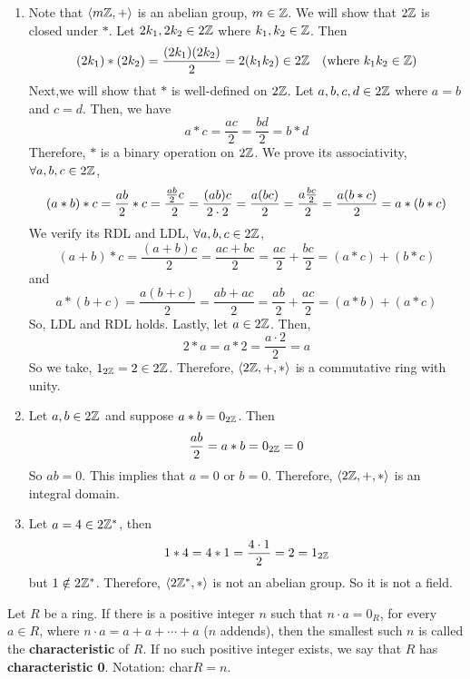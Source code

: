 \begin{solution} \phantom{blank}
    \begin{enumerate}
        \item Note that $\langle m\mathbb{Z}, + \rangle$ is an abelian group, $m \in \mathbb{Z}$. We will show that $2\mathbb{Z}$ is closed under $\ast$. Let $2k_1, 2k_2 \in 2\mathbb{Z}$ where $k_1, k_2 \in \mathbb{Z}$. Then
        \[ (2k_1) \ast (2k_2) = \frac{(2k_1)(2k_2)}{2} = 2(k_1k_2) \in 2\mathbb{Z} \hspace{1em} (\text{where } k_1k_2 \in \mathbb{Z}) \]
        Next,we will show that $\ast$ is well-defined on $2\mathbb{Z}$. Let $a, b, c, d \in 2\mathbb{Z}$ where $a = b$ and $c = d$. Then, we have
        \[ a \ast c = \frac{ac}{2} = \frac{bd}{2} = b \ast d \]
        Therefore, $\ast$ is a binary operation on $2\mathbb{Z}$. We prove its associativity, $\forall a, b, c \in 2\mathbb{Z}$, 
        \[ (a \ast b) \ast c = \frac{ab}{2} \ast c = \frac{\frac{ab}{2} c}{2} = \frac{(ab)c}{2 \cdot 2} = \frac{a (bc)}{2} = \frac{a \frac{bc}{2}}{2} = \frac{a (b \ast c)}{2} = a \ast \qty(b \ast c)  \]
        We verify its RDL and LDL,  $\forall a, b, c \in 2\mathbb{Z}$, 
        \[ (a + b) \ast c = \frac{(a + b)c}{2} = \frac{ac + bc}{2} = \frac{ac}{2} + \frac{bc}{2} = (a \ast c) + (b \ast c) \]
        and 
        \[ a \ast (b + c) = \frac{a(b + c)}{2} = \frac{ab + ac}{2} = \frac{ab}{2} + \frac{ac}{2} = (a \ast b) + (a \ast c) \]
        So, LDL and RDL holds. Lastly, let $a \in 2\mathbb{Z}$. Then,
        \[2 \ast a = a \ast 2 = \frac{a \cdot 2}{2} = a \]
        So we take, $1_{2\mathbb{Z}} = 2 \in 2\mathbb{Z}$. Therefore, $\langle 2\mathbb{Z}, +, \ast \rangle$ is a commutative ring with unity.
        
        \item Let $a, b \in 2\mathbb{Z}$ and suppose $a \ast b = 0_{2\mathbb{Z}}$. Then 
        \[ \frac{ab}{2} = a \ast b = 0_{2\mathbb{Z}} = 0 \]
        So $ab = 0$. This implies that $a = 0$ or $b = 0$. Therefore, $\langle 2\mathbb{Z}, +, \ast \rangle$ is an integral domain.
        
        \item Let $a = 4 \in 2\mathbb{Z}^{\ast}$, then 
        \[ 1 \ast 4 = 4 \ast 1 = \frac{4 \cdot 1}{2} = 2 = 1_{2\mathbb{Z}} \]
        but $1 \notin 2\mathbb{Z}^{\ast}$. Therefore, $\langle 2\mathbb{Z}^{\ast}, \ast \rangle$ is not an abelian group. So it is not a field.
    \end{enumerate}
\end{solution}

\begin{definition}[Characteristic]
    Let $R$ be a ring. If there is a positive integer $n$ such that $n \cdot a = 0_R$, for every $a \in R$, where $n \cdot a = a + a + \cdots + a$ ($n$ addends), then the smallest such $n$ is called the \textbf{characteristic} of $R$. If no such positive integer exists, we say that $R$ has \textbf{characteristic 0}. Notation: char$R = n$.
\end{definition}


